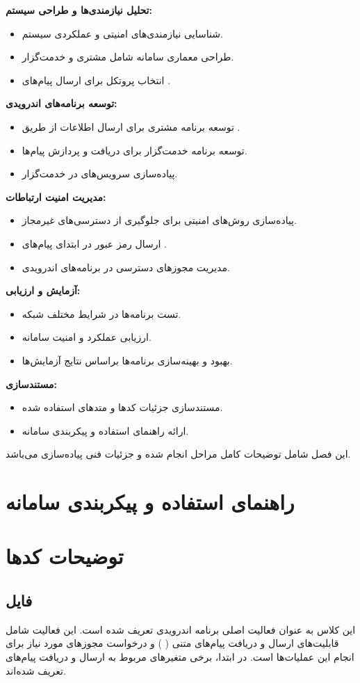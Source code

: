\documentclass{report}
\begin{document}
\textbf{تحلیل نیازمندی‌ها و طراحی سیستم:}
\begin{itemize}
	\item شناسایی نیازمندی‌های امنیتی و عملکردی سیستم.
	\item طراحی معماری سامانه شامل مشتری و خدمت‌گزار.
	\item انتخاب پروتکل
	برای ارسال پیام‌های
	.
\end{itemize}
\textbf{توسعه برنامه‌های اندرویدی:}
\begin{itemize}
	\item 
	توسعه برنامه مشتری برای ارسال اطلاعات از طریق
	.
	\item 
	توسعه برنامه خدمت‌گزار برای دریافت و پردازش پیام‌ها.
	\item 
	پیاده‌سازی سرویس‌های
	در خدمت‌گزار.
\end{itemize}
\textbf{مدیریت امنیت ارتباطات:}
\begin{itemize}
	\item 
	پیاده‌سازی روش‌های امنیتی برای جلوگیری از دسترسی‌های غیرمجاز.
	\item
	ارسال رمز عبور در ابتدای پیام‌های
	.
	\item
	مدیریت مجوزهای دسترسی در برنامه‌های اندرویدی.
\end{itemize}
\textbf{آزمایش و ارزیابی:}
\begin{itemize}
	\item تست برنامه‌ها در شرایط مختلف شبکه.
	\item ارزیابی عملکرد و امنیت سامانه.
	\item بهبود و بهینه‌سازی برنامه‌ها براساس نتایج آزمایش‌ها.
\end{itemize}
\textbf{مستندسازی:}
\begin{itemize}
	\item مستندسازی جزئیات کدها و متدهای استفاده شده.
	\item ارائه راهنمای استفاده و پیکربندی سامانه.
\end{itemize}
این فصل شامل توضیحات کامل مراحل انجام شده و جزئیات فنی پیاده‌سازی می‌باشد.

\chapter{راهنمای استفاده و پیکربندی سامانه}

\chapter{توضیحات کدها}
\section{فایل
}
این کلاس
 به عنوان فعالیت اصلی برنامه اندرویدی تعریف شده است. این فعالیت شامل قابلیت‌های ارسال و دریافت پیام‌های متنی (
 ) و درخواست مجوزهای مورد نیاز برای انجام این عملیات‌ها است. در ابتدا، برخی متغیرهای مربوط به ارسال و دریافت پیام‌های
   تعریف شده‌اند.
\end{document}
